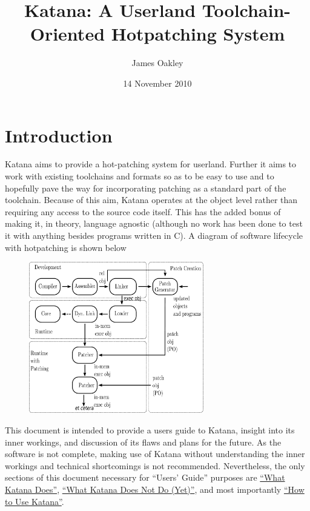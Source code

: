 \documentclass[11pt]{article}
\title{Katana: A Userland Toolchain-Oriented Hotpatching System}
\author{James Oakley}
\date{14 November 2010}
\begin{document}
\maketitle

\setcounter{tocdepth}{3}
\tableofcontents
\vspace*{1cm}


\section{Introduction}
\label{sec-1}

  Katana aims to provide a hot-patching system for userland. Further
  it aims to work with existing toolchains and formats so as to be
  easy to use and to hopefully pave the way for incorporating patching
  as a standard part of the toolchain. Because of this aim, Katana
  operates at the object level rather than requiring any access to the
  source code itself. This has the added bonus of making it, in
  theory, language agnostic (although no work has been done to test it
  with anything besides programs written in C). A diagram of software
  lifecycle with hotpatching is shown below


\begin{figure}[h!]
\includegraphics[width=3in]{./softwarelifecycle.pdf}
\end{figure}


  This document is intended to provide a users guide to Katana,
  insight into its inner workings, and discussion of its flaws and
  plans for the future. As the software is not complete, making use of
  Katana without understanding the inner workings and technical
  shortcomings is not recommended. Nevertheless, the only sections of
  this document necessary for ``Users' Guide'' purposes are 
  \hyperref[sec-3]{``What Katana Does''}, \hyperref[sec-4]{``What Katana Does Not Do (Yet)''}, and most importantly 
  \hyperref[sec-6]{``How to Use Katana''}.
 
\end{document}
